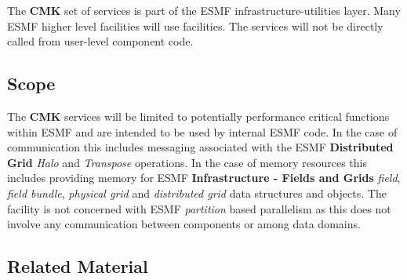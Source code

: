 The {\bf CMK} set of services is part of the ESMF infrastructure-utilities 
layer. Many ESMF higher level facilities will use {\bf \shortname} facilities.
The {\bf \shortname} services will not be directly called from user-level
component code.


\subsection{Scope}

The {\bf CMK} services will be limited to potentially performance
critical functions within ESMF and are intended to be used by internal ESMF
code. In the case of communication this includes messaging associated with the 
ESMF {\bf Distributed Grid} {\it Halo} and {\it Transpose} 
operations. In the case of memory resources this includes providing 
memory for ESMF {\bf Infrastructure - Fields and Grids} {\it field}, {\it field
bundle}, {\it physical grid} and {\it distributed grid} data structures and objects.
The {\bf \shortname} facility is not concerned with ESMF {\it partition}
based parallelism as this does not involve any communication between
components or among data domains.


\subsection{Related Material}

